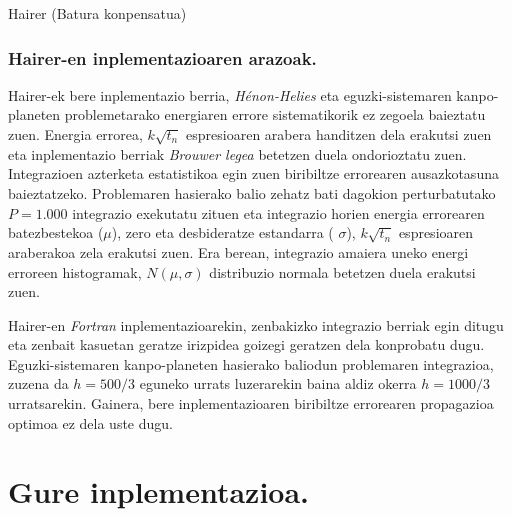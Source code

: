 \begin{algorithm}[h!]
  \caption{Hairer (Batura konpensatua)}
  \label{alg:Hairer-BK}
\end{algorithm} 


\subsubsection*{Hairer-en inplementazioaren arazoak.}

Hairer-ek bere inplementazio berria, \emph{Hénon-Helies} eta eguzki-sistemaren kanpo-planeten problemetarako energiaren errore sistematikorik ez zegoela baieztatu zuen. Energia errorea, $k\sqrt{t_n}$ espresioaren arabera handitzen dela erakutsi zuen eta inplementazio berriak \emph{Brouwer legea} \cite{Grazier2005} betetzen duela ondorioztatu zuen. Integrazioen azterketa estatistikoa egin zuen biribiltze errorearen ausazkotasuna baieztatzeko. Problemaren hasierako balio zehatz bati dagokion perturbatutako $P=1.000$ integrazio exekutatu zituen eta integrazio horien energia errorearen batezbestekoa ($\mu$), zero eta desbideratze estandarra ( $\sigma$), $k\sqrt{t_n}$ espresioaren araberakoa zela erakutsi zuen. Era berean, integrazio amaiera uneko energi erroreen histogramak, $N(\mu,\sigma)$ distribuzio normala betetzen duela erakutsi zuen.

Hairer-en \emph{Fortran} inplementazioarekin, zenbakizko integrazio berriak egin ditugu eta zenbait kasuetan geratze irizpidea goizegi geratzen dela konprobatu dugu. Eguzki-sistemaren kanpo-planeten hasierako baliodun problemaren integrazioa, zuzena da $h=500/3$ eguneko urrats luzerarekin baina aldiz okerra $h=1000/3$ urratsarekin.  Gainera, bere inplementazioaren biribiltze errorearen propagazioa optimoa ez dela uste dugu. 


\section{Gure inplementazioa.}


